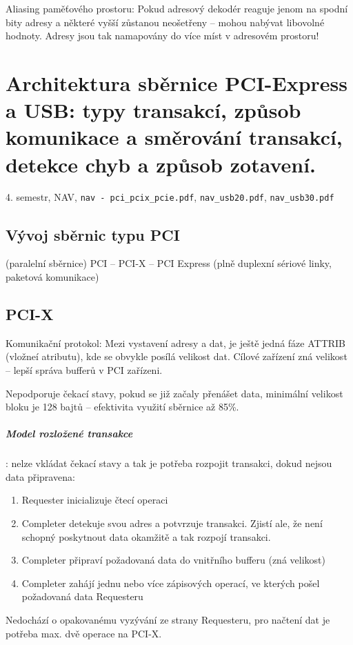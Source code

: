 \documentclass[a4paper, 11pt]{report}
\begin{document}
Aliasing paměťového prostoru: Pokud adresový dekodér reaguje jenom na spodní bity adresy a některé vyšší zůstanou neošetřeny -- mohou nabývat libovolné hodnoty. Adresy jsou tak namapovány do více míst v adresovém prostoru!



\chapter{Architektura sběrnice PCI-Express a USB: typy transakcí, způsob komunikace a směrování transakcí, detekce chyb a způsob zotavení.} \label{cha:63}
4. semestr, NAV, \texttt{nav - pci\_pcix\_pcie.pdf}, \texttt{nav\_usb20.pdf}, \texttt{nav\_usb30.pdf}

\section{Vývoj sběrnic typu PCI}

(paralelní sběrnice) PCI -- PCI-X -- PCI Express (plně duplexní sériové linky, paketová komunikace)

\section{PCI-X}
Komunikační protokol: Mezi vystavení adresy a dat, je ještě jedná fáze ATTRIB (vložneí atributu), kde se obvykle posílá velikost dat. Cílové zařízení zná velikost -- lepší správa bufferů v PCI zařízeni. 

Nepodporuje čekací stavy, pokud se již začaly přenášet data, minimální velikost bloku je 128 bajtů -- efektivita využití sběrnice až 85\%.

\paragraph{Model rozložené transakce}: nelze vkládat čekací stavy a tak je potřeba rozpojit transakci, dokud nejsou data připravena:
\begin{enumerate}
	\item Requester inicializuje čtecí operaci
	\item Completer detekuje svou adres a potvrzuje transakci. Zjistí ale, že není schopný poskytnout data okamžitě a tak rozpojí transakci.
	\item Completer připraví požadovaná data do vnitřního bufferu (zná velikost)
	\item Completer zahájí jednu nebo více zápisových operací, ve kterých pošel požadovaná data Requesteru
\end{enumerate}
Nedochází o opakovanému vyzývání ze strany Requesteru, pro načtení dat je potřeba max. dvě operace na PCI-X.
\end{document}
